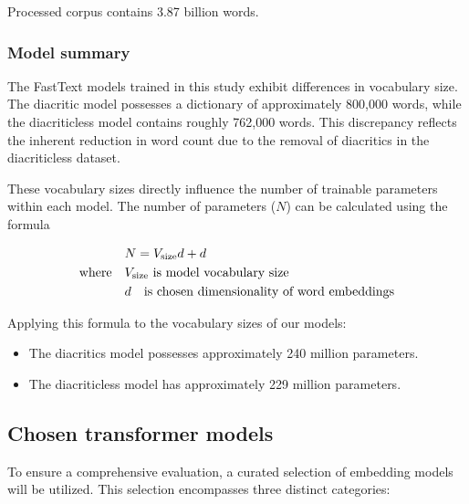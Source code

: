 Processed corpus contains 3.87 billion words.

\subsubsection{Model summary}

The FastText models trained in this study exhibit differences in vocabulary size.
The diacritic model possesses a dictionary of approximately 800,000 words, while the diacriticless model contains roughly 762,000 words.
This discrepancy reflects the inherent reduction in word count due to the removal of diacritics in the diacriticless dataset.

These vocabulary sizes directly influence the number of trainable parameters within each model.
The number of parameters ($N$) can be calculated using the formula~

\begin{align} \label{eq:cbow_parameters}
  & N = V_{\text{size}}d + d \\
  \text{where} \quad & V_{\text{size}} \text{ is model vocabulary size}  \notag \\
                      & d \quad \text{is chosen dimensionality of word embeddings} \notag
\end{align}
  
Applying this formula to the vocabulary sizes of our models:
\begin{itemize}
  \item The diacritics model possesses approximately 240 million parameters.
  \item The diacriticless model has approximately 229 million parameters.
\end{itemize}

\subsection{Chosen transformer models}
To ensure a comprehensive evaluation, a curated selection of embedding models will be utilized.
This selection encompasses three distinct categories:

